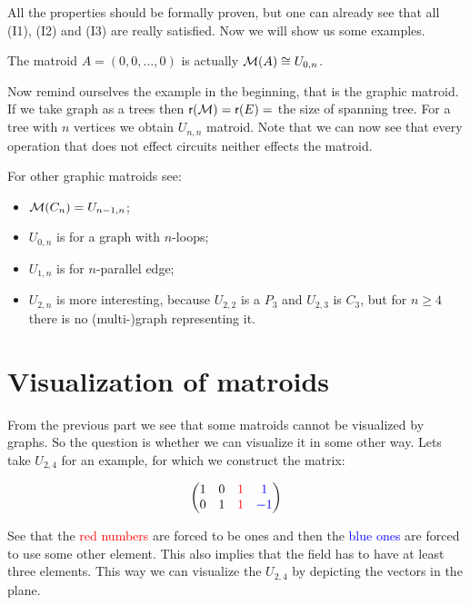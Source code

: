 All the properties should be formally proven, but one can already see that all (I1), (I2) and (I3) are really satisfied. Now we will show us some examples.

\begin{example}
	The matroid $A = (0, 0, \dots, 0)$ is actually $\mathcal{M}(A) \cong U_{0,n}$.
\end{example}

\begin{example}
	Now remind ourselves the example in the beginning, that is the graphic matroid. If we take graph as a trees then $\operatorname{\textsf{r}}(\mathcal{M}) = \operatorname{\textsf{r}}(E) =$ the size of spanning tree. For a tree with $n$ vertices we obtain $U_{n,n}$ matroid. Note that we can now see that every operation that does not effect circuits neither effects the matroid.
\end{example}

\begin{example}
	For other graphic matroids see:
	
	\begin{itemize}
		\item $\mathcal{M}(C_n) = U_{n-1,n}$;
		\item $U_{0,n}$ is for a graph with $n$-loops;
		\item $U_{1,n}$ is for $n$-parallel edge;
		\item $U_{2,n}$ is more interesting, because $U_{2,2}$ is a $P_3$ and $U_{2,3}$ is $C_3$, but for $n \geq 4$ there is no (multi-)graph representing it.
	\end{itemize}
\end{example}

\section{Visualization of matroids}

From the previous part we see that some matroids cannot be visualized by graphs. So the question is whether we can visualize it in some other way. Lets take $U_{2,4}$ for an example, for which we construct the matrix:

$$
\begin{pmatrix}
	1 & 0 & \textcolor{red}{1} & \textcolor{blue}{1}\\
	0 & 1 & \textcolor{red}{1} & \textcolor{blue}{-1}
\end{pmatrix}
$$

\noindent See that the \textcolor{red}{red numbers} are forced to be ones and then the \textcolor{blue}{blue ones} are forced to use some other element. This also implies that the field has to have at least three elements. This way we can visualize the $U_{2,4}$ by depicting the vectors in the plane.

